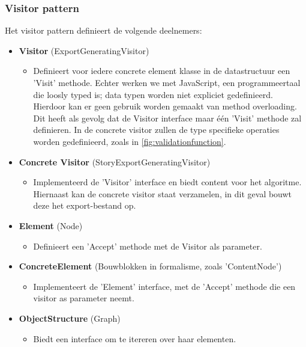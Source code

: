 \subsubsection{Visitor pattern}
Het visitor pattern definieert de volgende deelnemers:

\begin{itemize}
    \item \textbf{Visitor} (ExportGeneratingVisitor)
    \begin{itemize}
        \item Definieert voor iedere concrete element klasse in de datastructuur een 'Visit' methode. Echter werken we met JavaScript, een programmeertaal die loosly typed is; data typen worden niet expliciet gedefinieerd. Hierdoor kan er geen gebruik worden gemaakt van method overloading. Dit heeft als gevolg dat de Visitor interface maar één 'Visit' methode zal definieren. In de concrete visitor zullen de type specifieke operaties worden gedefinieerd, zoals in \autoref{fig:validationfunction}.
    \end{itemize}

    \item \textbf{Concrete Visitor} (StoryExportGeneratingVisitor)
    \begin{itemize}
        \item Implementeerd de 'Visitor' interface en biedt content voor het algoritme. Hiernaast kan de concrete visitor staat verzamelen, in dit geval bouwt deze het export-bestand op.
    \end{itemize}

    \item \textbf{Element} (Node)
    \begin{itemize}
        \item Definieert een 'Accept' methode met de Visitor als parameter.
    \end{itemize}

    \item \textbf{ConcreteElement} (Bouwblokken in formalisme, zoals 'ContentNode')
    \begin{itemize}
        \item Implementeert de 'Element' interface, met de 'Accept' methode die een visitor as parameter neemt.
    \end{itemize}

    \item \textbf{ObjectStructure} (Graph)
    \begin{itemize}
        \item Biedt een interface om te itereren over haar elementen.
    \end{itemize}
\end{itemize}

